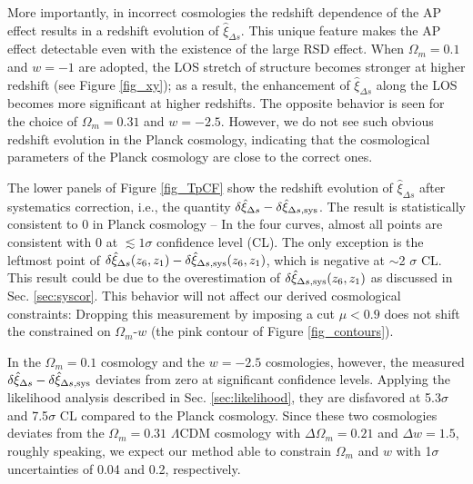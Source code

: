 \documentclass[iop]{emulateapj}
\begin{document}
More importantly, in incorrect cosmologies the redshift dependence of the AP effect results in a redshift evolution of $\hat \xi_{\Delta s}$.
This unique feature makes the AP effect detectable even with the existence of the large RSD effect. %
When $\Omega_m=0.1$ and $w=-1$ are adopted, 
the LOS stretch of structure becomes stronger at higher redshift (see Figure \ref{fig_xy});
as a result, the enhancement of $\hat \xi_{\Delta s}$ along the LOS 
becomes more significant at higher redshifts.
The opposite behavior is seen for the choice of $\Omega_m=0.31$ and $w=-2.5$.
However, we do not see such obvious redshift evolution in the Planck cosmology, %
 indicating that the cosmological parameters of the Planck cosmology are close to the correct ones.

The lower panels of Figure \ref{fig_TpCF} show the redshift evolution of $\hat\xi_{\Delta s}$ after systematics correction, 
i.e., the quantity $\delta\hat \xi_{\Delta s}-\delta\hat \xi_{\Delta s,\rm sys}$.
The result is statistically consistent to 0 in Planck cosmology -- 
In the four curves, almost all points are consistent with 0 at $\lesssim1\sigma$ confidence level (CL).
The only exception is the leftmost point of $\delta\hat \xi_{\Delta s}(z_6,z_1)-\delta\hat \xi_{\Delta s,\rm sys}(z_6,z_1)$,
 which is negative at $\sim$2 $\sigma$ CL.
This result could be due to the overestimation of $\delta\hat\xi_{\Delta s, \rm sys}(z_6,z_1)$ as discussed in Sec. \ref{sec:syscor}.
This behavior will not affect our derived cosmological constraints:
Dropping this measurement by imposing a cut $\mu<0.9$
  does not shift the constrained on $\Omega_m$-$w$ (the pink contour of Figure \ref{fig_contours}).

In the $\Omega_m=0.1$ cosmology and the $w=-2.5$ cosmologies, however,
the measured $\delta\hat \xi_{\Delta s}-\delta\hat \xi_{\Delta s,\rm sys}$ deviates 
from zero at significant confidence levels.
Applying the likelihood analysis described in Sec. \ref{sec:likelihood},
 they are disfavored at 5.3$\sigma$ and 7.5$\sigma$ CL compared to the Planck cosmology.
Since these two cosmologies deviates from the $\Omega_m=0.31$ $\Lambda$CDM cosmology with $\Delta \Omega_m = 0.21$ and $\Delta w = 1.5$,
roughly speaking, we expect our method able to constrain $\Omega_m$ and $w$ with 1$\sigma$ uncertainties of 0.04 and 0.2, respectively.
\end{document}
